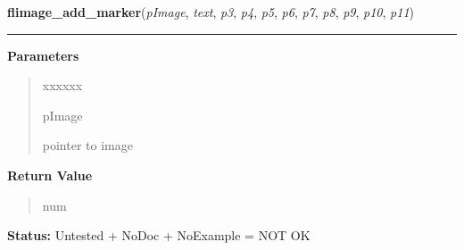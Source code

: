 \hspace{.8\funcindent}\begin{boxedminipage}{\funcwidth}

    \raggedright \textbf{flimage\_add\_marker}(\textit{pImage}, \textit{text}, \textit{p3}, \textit{p4}, \textit{p5}, \textit{p6}, \textit{p7}, \textit{p8}, \textit{p9}, \textit{p10}, \textit{p11})

    \vspace{-1.5ex}

    \rule{\textwidth}{0.5\fboxrule}
\setlength{\parskip}{2ex}
\setlength{\parskip}{1ex}
      \textbf{Parameters}
      \vspace{-1ex}

      \begin{quote}
        \begin{Ventry}{xxxxxx}

          \item[pImage]

          pointer to image

        \end{Ventry}

      \end{quote}

      \textbf{Return Value}
    \vspace{-1ex}

      \begin{quote}
      num

      \end{quote}

\textbf{Status:} Untested + NoDoc + NoExample = NOT OK



    \end{boxedminipage}

    \label{xformslib:library:flimage_add_marker_struct}

    \vspace{0.5ex}

